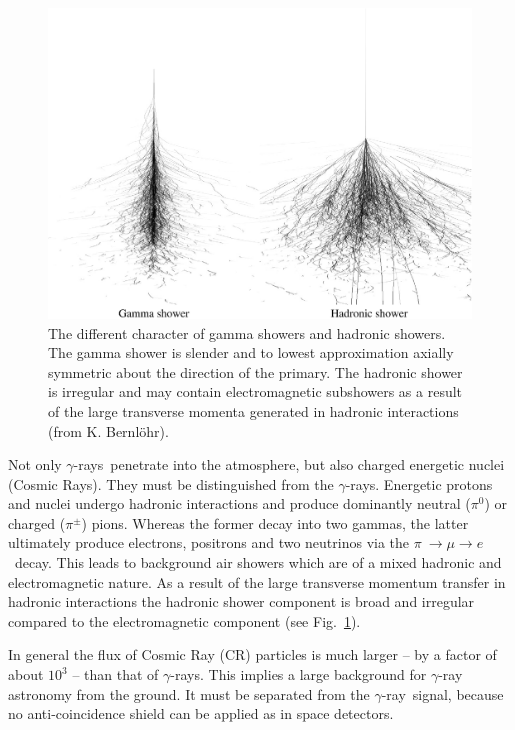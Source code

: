 \documentclass{svjour3x}                     %
\newcommand{\gr}{$\gamma$-ray}
\newcommand{\grs}{$\gamma$-rays}
\newcommand{\byKB}{ (from K. Bernl\"ohr)}
\begin{document}
\begin{figure}
   \includegraphics[width=\textwidth]{different_showers.eps} 
  \caption[Gamma showers and hadronic showers]{The different character of gamma showers and hadronic showers. The
    gamma shower is slender and to lowest approximation axially symmetric about
    the direction of the primary. The hadronic shower is irregular and may
    contain electromagnetic subshowers as a result of the large transverse
    momenta generated in hadronic interactions\byKB.}
\label{fig:2}       %
\end{figure}
%

Not only \grs\ penetrate into the atmosphere, but also charged energetic nuclei
(Cosmic Rays). They must be distinguished from the \grs. Energetic protons and
nuclei undergo hadronic interactions and produce dominantly neutral ($\pi^0$)
or charged ($\pi^{\pm}$) pions. Whereas the former decay into two gammas, the
latter ultimately produce electrons, positrons and two neutrinos via the $\pi~
\rightarrow \mu \rightarrow e$~decay. This leads to background air showers
which are of a mixed hadronic and electromagnetic nature. As a result
of the large transverse momentum transfer in hadronic interactions the hadronic
shower component is broad and irregular compared to the electromagnetic
component (see Fig.~\ref{fig:2}).

In general the flux of Cosmic Ray (CR) particles is much larger -- by a factor
of about $10^3$ -- than that of \grs. This implies a large background for \gr
 astronomy from the ground. It must be separated from the \gr\ signal, because
no anti-coincidence shield can be applied as in space detectors.
\end{document}
